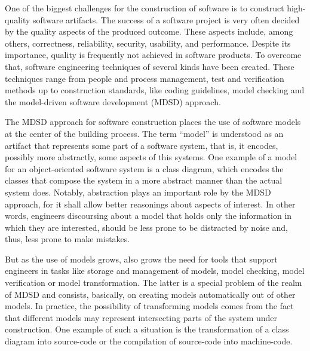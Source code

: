 One of the biggest challenges for the construction of software is to construct high-quality software artifacts. The success of a software project is very often decided by the quality aspects of the produced outcome. These aspects include, among others, correctness, reliability, security, usability, and performance. Despite its importance, quality is frequently not achieved in software products. To overcome that, software engineering techniques of several kinds have been created. These techniques range from people and process management, test and verification methods up to construction standards, like coding guidelines, model checking and the model-driven software development (MDSD) approach.

The MDSD approach for software construction places the use of software models at the center of the building process. The term ``model'' is understood as an artifact that represents some part of a software system, that is, it encodes, possibly more abstractly, some aspects of this systems. One example of a model for an object-oriented software system is a class diagram, which encodes the classes that compose the system in a more abstract manner than the actual system does. Notably, abstraction plays an important role by the MDSD approach, for it shall allow better reasonings about aspects of interest. In other words, engineers discoursing about a model that holds only the information in which they are interested, should be less prone to be distracted by noise and, thus, less prone to make mistakes.

But as the use of models grows, also grows the need for tools that support engineers in tasks like storage and management of models, model checking, model verification or model transformation. The latter is a special problem of the realm of MDSD and consists, basically, on creating models automatically out of other models. In practice, the possibility of transforming models comes from the fact that different models may represent intersecting parts of the system under construction. One example of such a situation is the transformation of a class diagram into source-code or the compilation of source-code into machine-code.

